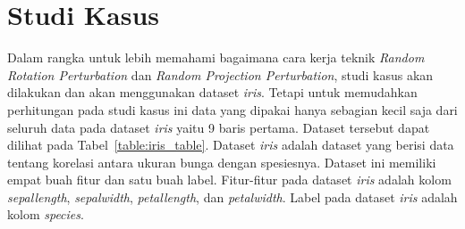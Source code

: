 \section{Studi Kasus}
\label{sec:studi-kasus}

Dalam rangka untuk lebih memahami bagaimana cara kerja teknik \textit{Random Rotation Perturbation} dan \textit{Random Projection Perturbation}, studi kasus akan dilakukan dan akan menggunakan dataset \textit{iris}. Tetapi untuk memudahkan perhitungan pada studi kasus ini data yang dipakai hanya sebagian kecil saja dari seluruh data pada dataset \textit{iris} yaitu 9 baris pertama. Dataset tersebut dapat dilihat pada Tabel~\ref{table:iris_table}. Dataset \textit{iris} adalah dataset yang berisi data tentang korelasi antara ukuran bunga dengan spesiesnya. Dataset ini memiliki empat buah fitur dan satu buah label. Fitur-fitur pada dataset \textit{iris} adalah kolom \textit{sepal\textunderscore length}, \textit{sepal\textunderscore width}, \textit{petal\textunderscore length}, dan \textit{petal\textunderscore width}. Label pada dataset \textit{iris} adalah kolom \textit{species}.

